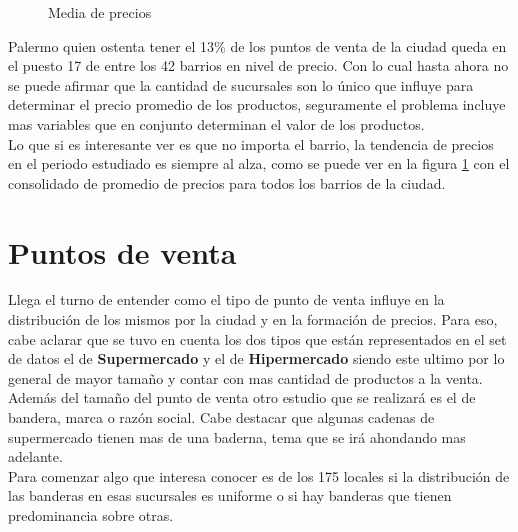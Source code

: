 \begin{figure}
\centering
{}%
\caption{Media de precios}
\label{media_precios}
\end{figure}

Palermo quien ostenta tener el 13\%  de los puntos de venta de la ciudad queda en el puesto 17 de entre los 42 barrios en nivel de precio. Con lo cual hasta ahora no se puede afirmar que la cantidad de sucursales son lo único que influye para determinar el precio promedio de los productos, seguramente el problema incluye mas variables que en conjunto determinan el valor de los productos.\\
Lo que si es interesante ver es que no importa el barrio, la tendencia de precios en el periodo estudiado es siempre al alza, como se puede ver en la figura \ref{media_precios} con el consolidado de promedio de precios para todos los barrios de la ciudad.\\


\section{Puntos de venta}

Llega el turno de entender como el tipo de punto de venta influye en la distribución de los mismos por la ciudad y en la formación de precios. Para eso, cabe aclarar que se tuvo en cuenta los dos tipos que están representados en el set de datos el de \textbf{Supermercado} y el de \textbf{Hipermercado} siendo este ultimo por lo general de mayor tamaño y contar con mas cantidad de productos a la venta. Además del tamaño del punto de venta otro estudio que se realizará es el de bandera,  marca o razón social. Cabe destacar que algunas cadenas de supermercado tienen mas de una baderna, tema que se irá ahondando mas adelante.\\
Para comenzar algo que interesa conocer es de los 175 locales si la distribución de las banderas en esas sucursales es uniforme o si hay banderas que tienen predominancia sobre otras.


